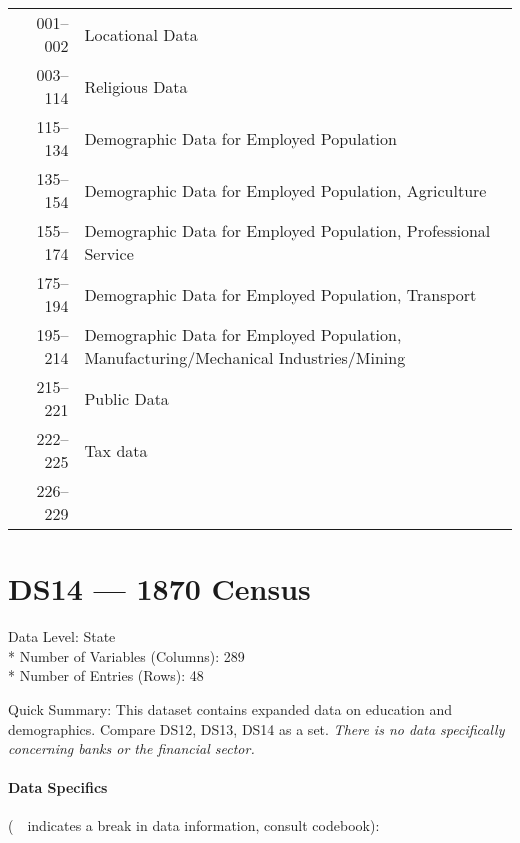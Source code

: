 ﻿\documentclass[12pt]{report}
\begin{document}
	\begin{tabular}{r|l}
		001--002 & Locational Data\\
		003--114 & Religious Data\\
		115--134 & Demographic Data for Employed Population\\
		135--154 & Demographic Data for Employed Population, Agriculture\\
		155--174 & Demographic Data for Employed Population, Professional Service\\
		175--194 & Demographic Data for Employed Population, Transport\\
		195--214 & \parbox[t]{10cm}{Demographic Data for Employed Population,\\ Manufacturing/Mechanical Industries/Mining}\\
		215--221 & Public Data\\
		222--225 & Tax data\\
		226--229 & \guillemotleft~\guillemotright
	\end{tabular}
	\newpage

\section{DS14 --- 1870 Census}
	Data Level: State\\*
	Number of Variables (Columns): 289\\*
	Number of Entries (Rows): 48
	\vspace{1.5em}
	
	\noindent Quick Summary: This dataset contains expanded data on education and demographics. Compare DS12, DS13, DS14 as a set. \textit{There is no data specifically concerning banks or the financial sector.}
	
	\paragraph{Data Specifics} (\guillemotleft~\guillemotright~indicates a break in data information, consult codebook):
	\vspace{1em}
	
\end{document}
